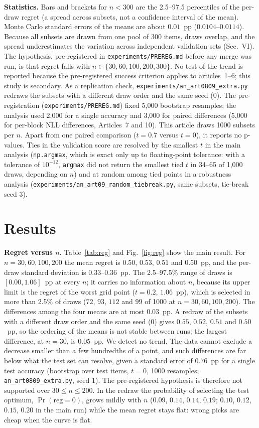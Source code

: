 \documentclass[conference]{IEEEtran}
\begin{document}
\textbf{Statistics.} Bars and brackets for $n<300$ are the 2.5--97.5 percentiles of the per-draw regret (a spread across subsets, not a confidence interval of the mean). Monte Carlo standard errors of the means are about $0.01$~pp ($0.0104$--$0.0114$). Because all subsets are drawn from one pool of 300 items, draws overlap, and the spread underestimates the variation across independent validation sets (Sec.~VI). The hypothesis, pre-registered in \texttt{experiments/PREREG.md} before any merge was run, is that regret falls with $n\in\{30,60,100,200,300\}$. No test of the trend is reported because the pre-registered success criterion applies to articles~1--6; this study is secondary. As a replication check, \texttt{experiments/an\_art0809\_extra.py} redraws the subsets with a different draw order and the same seed (0). The pre-registration (\texttt{experiments/PREREG.md}) fixed 5,000 bootstrap resamples; the analysis used 2,000 for a single accuracy and 3,000 for paired differences (5,000 for per-block NLL differences, Articles~7 and 10). This article draws 1000 subsets per $n$. Apart from one paired comparison ($t=0.7$ versus $t=0$), it reports no p-values. Ties in the validation score are resolved by the smallest $t$ in the main analysis (\texttt{np.argmax}, which is exact only up to floating-point tolerance: with a tolerance of $10^{-12}$, \texttt{argmax} did not return the smallest tied $t$ in 34--65 of 1,000 draws, depending on $n$) and at random among tied points in a robustness analysis (\texttt{experiments/an\_art09\_random\_tiebreak.py}, same subsets, tie-break seed 3).

\section{Results}
\textbf{Regret versus $n$.} Table~\ref{tab:reg} and Fig.~\ref{fig:reg} show the main result. For $n=30,60,100,200$ the mean regret is $0.50$, $0.53$, $0.51$ and $0.50$~pp, and the per-draw standard deviation is $0.33$--$0.36$~pp. The 2.5--97.5\% range of draws is $[0.00,1.06]$~pp at every $n$; it carries no information about $n$, because its upper limit is the regret of the worst grid point ($t=0.2$, $1.06$~pp), which is selected in more than 2.5\% of draws ($72$, $93$, $112$ and $99$ of 1000 at $n=30,60,100,200$). The differences among the four means are at most $0.03$~pp. A redraw of the subsets with a different draw order and the same seed (0) gives $0.55$, $0.52$, $0.51$ and $0.50$~pp, so the ordering of the means is not stable between runs; the largest difference, at $n=30$, is $0.05$~pp. We detect no trend. The data cannot exclude a decrease smaller than a few hundredths of a point, and such differences are far below what the test set can resolve, given a standard error of $0.76$~pp for a single test accuracy (bootstrap over test items, $t=0$, 1000 resamples; \texttt{an\_art0809\_extra.py}, seed 1). The pre-registered hypothesis is therefore not supported over $30\le n\le200$. In the redraw the probability of selecting the test optimum, $\Pr(\mathrm{reg}=0)$, grows mildly with $n$ ($0.09$, $0.14$, $0.14$, $0.19$; $0.10$, $0.12$, $0.15$, $0.20$ in the main run) while the mean regret stays flat: wrong picks are cheap when the curve is flat.
\end{document}

